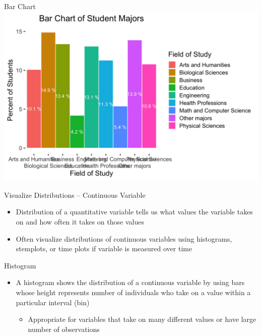 \documentclass{beamer}
\begin{document}
\begin{frame}{Bar Chart}
    \includegraphics[width= \linewidth]{bar.png}
\end{frame}


\begin{frame}{Visualize Distributions -- Continuous Variable}
    \begin{itemize}
        \item Distribution of a quantitative variable tells us what values the variable takes on and how often it takes on those values
        \item Often visualize distributions of continuous variables using \alert{histograms}, \alert{stemplots}, or \alert{time plots} if variable is measured over time
    \end{itemize}
\end{frame}

\begin{frame}{Histogram}
    \begin{itemize}
        \item A \alert{histogram} shows the distribution of a continuous variable by using bars whose height represents number of individuals who take on a value within a particular interval (bin)
        \begin{itemize}
            \item Appropriate for variables that take on many different values or have large number of observations
        \end{itemize}
    \end{itemize}
\end{frame}
\end{document}
